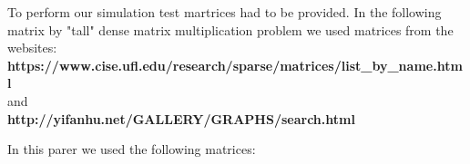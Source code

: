 \documentclass{scrreprt}
\begin{document}
To perform our simulation test martrices had to be provided. In the following matrix by "tall" dense matrix multiplication problem we used matrices from the websites: \\
\textbf{https://www.cise.ufl.edu/research/sparse/matrices/list_by_name.html} \\
and \\
\textbf{http://yifanhu.net/GALLERY/GRAPHS/search.html}

In this parer we used the following matrices:




\setlength{\arrayrulewidth}{1mm}
\setlength{\tabcolsep}{12pt}
\renewcommand{\arraystretch}{3}
 
 
\end{document}
